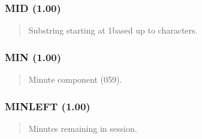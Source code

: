 \documentclass[letterpaper,10pt,english]{sphinxmanual}
\begin{document}
\subsubsection{MID (1.00)}
\label{\detokenize{ppl:mid-1-00}}\begin{quote}

\sphinxAtStartPar
{}
\begin{description}
\sphinxAtStartPar
Substring starting at 1\sphinxhyphen{}based  up to  characters.

\end{description}
\end{quote}


\subsubsection{MIN (1.00)}
\label{\detokenize{ppl:min-1-00}}\begin{quote}

\sphinxAtStartPar
{}
\begin{description}
\sphinxAtStartPar
Minute component (0\textendash{}59).

\end{description}
\end{quote}


\subsubsection{MINLEFT (1.00)}
\label{\detokenize{ppl:minleft-1-00}}\begin{quote}

\sphinxAtStartPar
{}
\begin{description}
\sphinxAtStartPar
Minutes remaining in session.

\end{description}
\end{quote}
\end{document}
